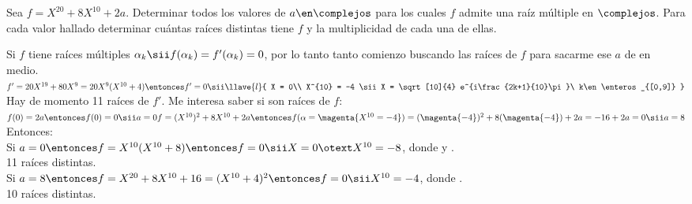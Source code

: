 \ejercicio

Sea $f = X^{20} + 8X^{10} + 2a$. Determinar todos los valores de
$a \en \complejos$ para los cuales $f$ admite una raíz múltiple en
$\complejos$. Para cada valor hallado determinar cuántas raíces
distintas tiene $f$ y la multiplicidad de cada una de ellas.

\separadorCorto

Si $f$ tiene raíces múltiples
$
	\alpha_k
	\sii
	f(\alpha_k) = f'(\alpha_k) =  0$,
por lo tanto  tanto comienzo buscando las raíces de $f$ para sacarme ese
$a$ de en medio.\\

$
	f' = 20X^{19} + 80 X^9 =
	20 X^9 (X^{10} + 4)
	\entonces
	f' = 0
	\sii
	\llave{l}{
		X = 0\\
		X^{10} = -4
		\sii
		X = \sqrt[10]{4} e^{i\frac{2k+1}{10}\pi}\ k\en \enteros_{[0,9]}
	}
$\\
Hay de momento 11 raíces de $f'$. Me interesa saber si son raíces de $f$:\\
$
	f(0) = 2a
	\entonces
	f(0) = 0
	\sii
	a = 0\\
	f =
	(X^{10})^2 + 8X^{10} + 2a
	\entonces
	f(\alpha = \magenta{X^{10} = -4}) =
	(\magenta{-4})^2 + 8(\magenta{-4}) + 2a =
	-16 + 2a = 0
	\sii
	a = 8
$\\

Entonces:\\
Si
$
	a = 0
	\entonces
	f = X^{10}(X^{10} + 8)\\
	\entonces
	f = 0
	\sii
	X = 0 \otext X^{10} = -8
$, donde
 y
.\\
11 raíces distintas.\\

Si
$
	a = 8
	\entonces
	f = X^{20} + 8X^{10} + 16 = (X^{10} + 4)^2\\
	\entonces
	f = 0
	\sii
	X^{10} = -4
$, donde
.\\
10 raíces distintas.
